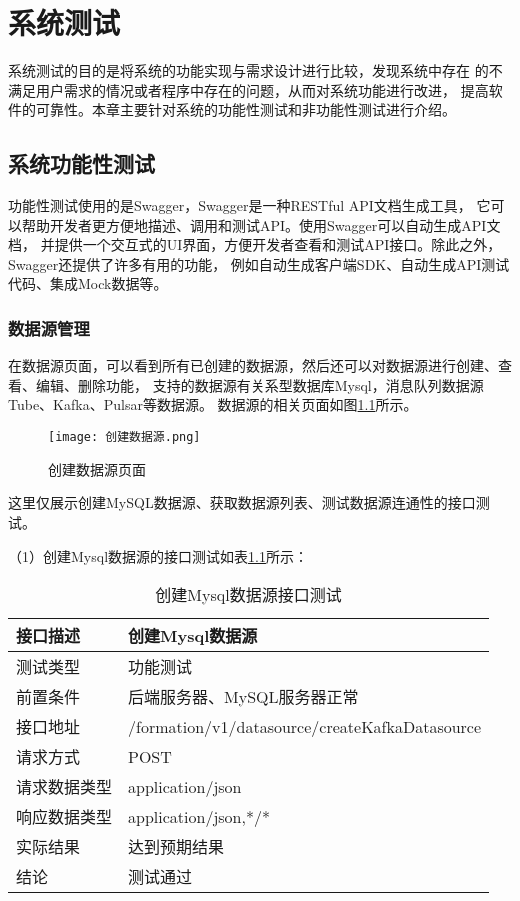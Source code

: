 
\chapter{系统测试}

系统测试的目的是将系统的功能实现与需求设计进行比较，发现系统中存在
的不满足用户需求的情况或者程序中存在的问题，从而对系统功能进行改进，
提高软件的可靠性。本章主要针对系统的功能性测试和非功能性测试进行介绍\cite{32}。

\section{系统功能性测试}

功能性测试使用的是Swagger，Swagger是一种RESTful API文档生成工具，
它可以帮助开发者更方便地描述、调用和测试API。使用Swagger可以自动生成API文档，
并提供一个交互式的UI界面，方便开发者查看和测试API接口。除此之外，Swagger还提供了许多有用的功能，
例如自动生成客户端SDK、自动生成API测试代码、集成Mock数据等。

\subsection{数据源管理}

在数据源页面，可以看到所有已创建的数据源，然后还可以对数据源进行创建、查看、编辑、删除功能，
支持的数据源有关系型数据库Mysql，消息队列数据源Tube、Kafka、Pulsar等数据源。
数据源的相关页面如图\ref{fig:创建数据源页面}所示。

\begin{figure}[H]
  \centering
  \texttt{[image: 创建数据源.png]}
  \caption{创建数据源页面}
  \label{fig:创建数据源页面}
\end{figure}

这里仅展示创建MySQL数据源、获取数据源列表、测试数据源连通性的接口测试。

（1）创建Mysql数据源的接口测试如表\ref{tab:exampletable1}所示：

\begin{table}[H]
  \centering
  \caption{创建Mysql数据源接口测试}
  \label{tab:exampletable1}
  \begin{tabular}{ll}
    \toprule
    接口描述         & 创建Mysql数据源          \\
    \midrule
    测试类型         & 功能测试         \\
    前置条件         & 后端服务器、MySQL服务器正常         \\
    接口地址       & /formation/v1/datasource/createKafkaDatasource         \\
    请求方式         & POST      \\
    请求数据类型         & application/json     \\
    响应数据类型         & application/json,*/*           \\
    实际结果         & 达到预期结果           \\
    结论            & 测试通过           \\
    \bottomrule
  \end{tabular}
\end{table}

